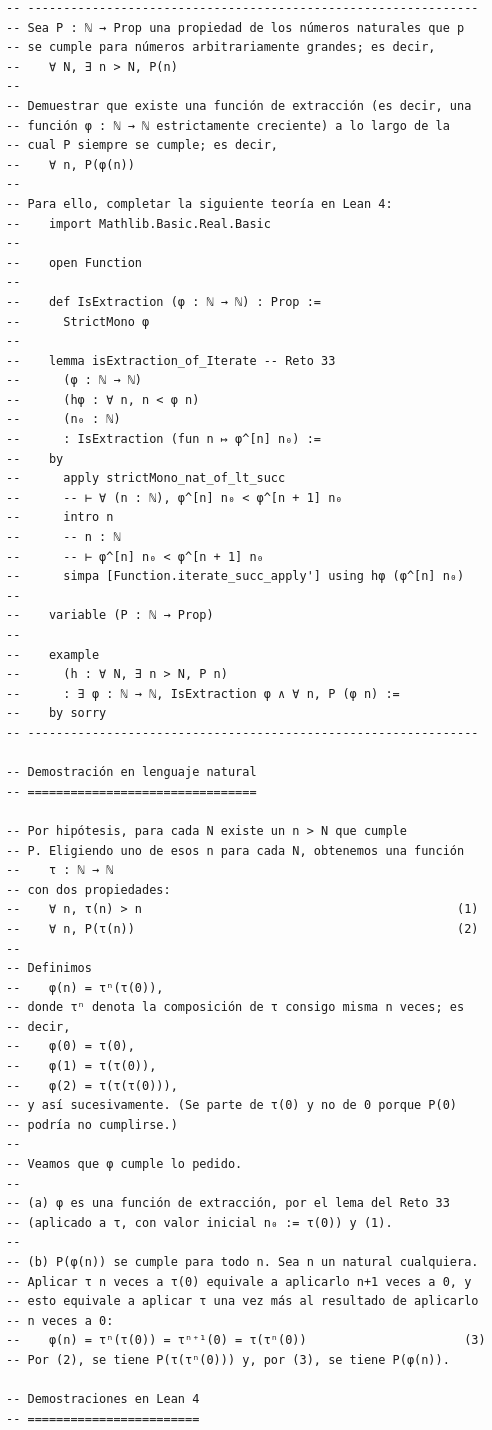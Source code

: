 \begin{verbatim}
-- ---------------------------------------------------------------
-- Sea P : ℕ → Prop una propiedad de los números naturales que p
-- se cumple para números arbitrariamente grandes; es decir,
--    ∀ N, ∃ n > N, P(n)
--
-- Demuestrar que existe una función de extracción (es decir, una
-- función φ : ℕ → ℕ estrictamente creciente) a lo largo de la
-- cual P siempre se cumple; es decir,
--    ∀ n, P(φ(n))
--
-- Para ello, completar la siguiente teoría en Lean 4:
--    import Mathlib.Basic.Real.Basic
--
--    open Function
--
--    def IsExtraction (φ : ℕ → ℕ) : Prop :=
--      StrictMono φ
--
--    lemma isExtraction_of_Iterate -- Reto 33
--      (φ : ℕ → ℕ)
--      (hφ : ∀ n, n < φ n)
--      (n₀ : ℕ)
--      : IsExtraction (fun n ↦ φ^[n] n₀) :=
--    by
--      apply strictMono_nat_of_lt_succ
--      -- ⊢ ∀ (n : ℕ), φ^[n] n₀ < φ^[n + 1] n₀
--      intro n
--      -- n : ℕ
--      -- ⊢ φ^[n] n₀ < φ^[n + 1] n₀
--      simpa [Function.iterate_succ_apply'] using hφ (φ^[n] n₀)
--
--    variable (P : ℕ → Prop)
--
--    example
--      (h : ∀ N, ∃ n > N, P n)
--      : ∃ φ : ℕ → ℕ, IsExtraction φ ∧ ∀ n, P (φ n) :=
--    by sorry
-- ---------------------------------------------------------------

-- Demostración en lenguaje natural
-- ================================

-- Por hipótesis, para cada N existe un n > N que cumple
-- P. Eligiendo uno de esos n para cada N, obtenemos una función
--    τ : ℕ → ℕ
-- con dos propiedades:
--    ∀ n, τ(n) > n                                            (1)
--    ∀ n, P(τ(n))                                             (2)
--
-- Definimos
--    φ(n) = τⁿ(τ(0)),
-- donde τⁿ denota la composición de τ consigo misma n veces; es
-- decir,
--    φ(0) = τ(0),
--    φ(1) = τ(τ(0)),
--    φ(2) = τ(τ(τ(0))),
-- y así sucesivamente. (Se parte de τ(0) y no de 0 porque P(0)
-- podría no cumplirse.)
--
-- Veamos que φ cumple lo pedido.
--
-- (a) φ es una función de extracción, por el lema del Reto 33
-- (aplicado a τ, con valor inicial n₀ := τ(0)) y (1).
--
-- (b) P(φ(n)) se cumple para todo n. Sea n un natural cualquiera.
-- Aplicar τ n veces a τ(0) equivale a aplicarlo n+1 veces a 0, y
-- esto equivale a aplicar τ una vez más al resultado de aplicarlo
-- n veces a 0:
--    φ(n) = τⁿ(τ(0)) = τⁿ⁺¹(0) = τ(τⁿ(0))                      (3)
-- Por (2), se tiene P(τ(τⁿ(0))) y, por (3), se tiene P(φ(n)).

-- Demostraciones en Lean 4
-- ========================


\end{verbatim}
